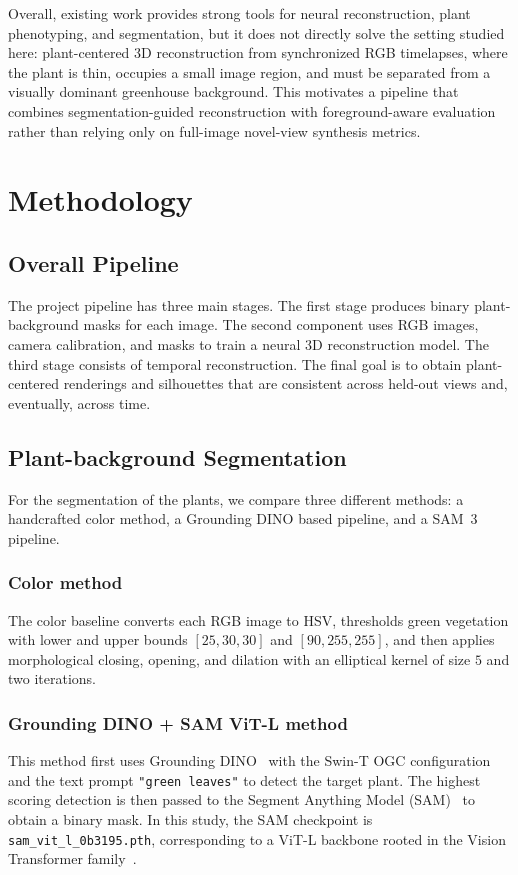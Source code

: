 \documentclass[sigconf]{acmart}
\begin{document}
Overall, existing work provides strong tools for neural reconstruction, plant phenotyping, and segmentation, but it does not directly solve the setting studied here: plant-centered 3D reconstruction from synchronized RGB timelapses, where the plant is thin, occupies a small image region, and must be separated from a visually dominant greenhouse background. This motivates a pipeline that combines segmentation-guided reconstruction with foreground-aware evaluation rather than relying only on full-image novel-view synthesis metrics.



\section{Methodology}

\subsection{Overall Pipeline}
The project pipeline has three main stages. The first stage produces binary plant-background masks for each image. The second component uses RGB images, camera calibration, and masks to train a neural 3D reconstruction model. The third stage consists of temporal reconstruction. The final goal is to obtain plant-centered renderings and silhouettes that are consistent across held-out views and, eventually, across time.

\subsection{Plant-background Segmentation}
For the segmentation of the plants, we compare three different methods: a handcrafted color method, a Grounding DINO based pipeline, and a SAM~3 pipeline. 
\subsubsection{Color method}
The color baseline converts each RGB image to HSV, thresholds green vegetation with lower and upper bounds $[25,30,30]$ and $[90,255,255]$, and then applies morphological closing, opening, and dilation with an elliptical kernel of size $5$ and two iterations. 
\subsubsection{Grounding DINO + SAM ViT-L method}
This method first uses Grounding DINO~\cite{liu2023groundingdino} with the Swin-T OGC configuration and the text prompt \texttt{"green leaves"} to detect the target plant. The highest scoring detection is then passed to the Segment Anything Model (SAM)~\cite{kirillov2023segmentanything} to obtain a binary mask. In this study, the SAM checkpoint is \texttt{sam\_vit\_l\_0b3195.pth}, corresponding to a ViT-L backbone rooted in the Vision Transformer family~\cite{dosovitskiy2021vit}.
\end{document}
